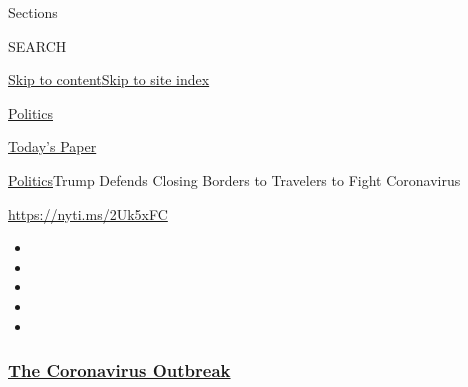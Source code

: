 Sections

SEARCH

\protect\hyperlink{site-content}{Skip to
content}\protect\hyperlink{site-index}{Skip to site index}

\href{https://www.nytimes3xbfgragh.onion/section/politics}{Politics}

\href{https://myaccount.nytimes3xbfgragh.onion/auth/login?response_type=cookie\&client_id=vi}{}

\href{https://www.nytimes3xbfgragh.onion/section/todayspaper}{Today's
Paper}

\href{/section/politics}{Politics}\textbar{}Trump Defends Closing
Borders to Travelers to Fight Coronavirus

\url{https://nyti.ms/2Uk5xFC}

\begin{itemize}
\item
\item
\item
\item
\item
\end{itemize}

\hypertarget{the-coronavirus-outbreak}{%
\subsubsection{\texorpdfstring{\href{https://www.nytimes3xbfgragh.onion/news-event/coronavirus?name=styln-coronavirus-national\&region=TOP_BANNER\&block=storyline_menu_recirc\&action=click\&pgtype=Article\&impression_id=0b028410-f293-11ea-ac04-1b9516e30825\&variant=undefined}{The
Coronavirus
Outbreak}}{The Coronavirus Outbreak}}\label{the-coronavirus-outbreak}}

